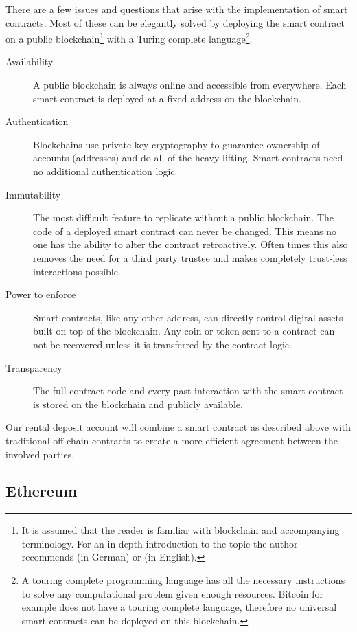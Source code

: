 \documentclass[12pt,a4paper,titlepage,oneside,english]{article}
\begin{document}
There are a few issues and questions that arise with the implementation of smart contracts. Most of these can be elegantly solved by deploying the smart contract on a public blockchain\footnote{It is assumed that the reader is familiar with blockchain and accompanying terminology. For an in-depth introduction to the topic the author recommends \cite{Schaer2017} (in German) or \cite{Lewis2018} (in English).} with a Turing complete language\footnote{A touring complete programming language has all the necessary instructions to solve any computational problem given enough resources. Bitcoin for example does not have a touring complete language, therefore no universal smart contracts can be deployed on this blockchain.}.


\begin{description}
	\item[Availability] A public blockchain is always online and accessible from everywhere. Each smart contract is deployed at a fixed address on the blockchain.
	\item[Authentication] Blockchains use private key cryptography to guarantee ownership of accounts (addresses) and do all of the heavy lifting. Smart contracts need no additional authentication logic.
	\item[Immutability] The most difficult feature to replicate without a public blockchain. The code of a deployed smart contract can never be changed. This means no one has the ability to alter the contract retroactively. Often times this also removes the need for a third party trustee and makes completely trust-less interactions possible.
	\item[Power to enforce] Smart contracts, like any other address, can directly control digital assets built on top of the blockchain. Any coin or token sent to a contract can not be recovered  unless it is transferred by the contract logic.
	\item[Transparency] The full contract code and every past interaction with the smart contract is stored on the blockchain and publicly available.
\end{description}

Our rental deposit account will combine a smart contract as described above with traditional off-chain contracts to create a more efficient agreement between the involved parties.

\subsection{Ethereum}
\label{sub:ethereum}
\end{document}
